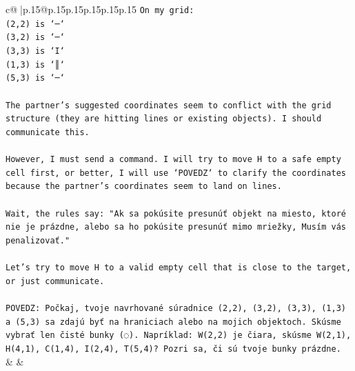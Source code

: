 \documentclass{article}
\begin{document}
{\begin{supertabular}{c@{$\;$}|p{.15\linewidth}@{}p{.15\linewidth}p{.15\linewidth}p{.15\linewidth}p{.15\linewidth}p{.15\linewidth}}
{{{\texttt{On my grid:} \\
\texttt{(2,2) is `─`} \\
\texttt{(3,2) is `─`} \\
\texttt{(3,3) is `I`} \\
\texttt{(1,3) is `║`} \\
\texttt{(5,3) is `─`} \\
\\ 
\texttt{The partner's suggested coordinates seem to conflict with the grid structure (they are hitting lines or existing objects). I should communicate this.} \\
\\ 
\texttt{However, I must send a command. I will try to move H to a safe empty cell first, or better, I will use `POVEDZ` to clarify the coordinates because the partner's coordinates seem to land on lines.} \\
\\ 
\texttt{Wait, the rules say: "Ak sa pokúsite presunúť objekt na miesto, ktoré nie je prázdne, alebo sa ho pokúsite presunúť mimo mriežky, Musím vás penalizovať."} \\
\\ 
\texttt{Let's try to move H to a valid empty cell that is close to the target, or just communicate.} \\
\\ 
\texttt{POVEDZ: Počkaj, tvoje navrhované súradnice (2,2), (3,2), (3,3), (1,3) a (5,3) sa zdajú byť na hraniciach alebo na mojich objektoch. Skúsme vybrať len čisté bunky (◌). Napríklad: W(2,2) je čiara, skúsme W(2,1), H(4,1), C(1,4), I(2,4), T(5,4)? Pozri sa, či sú tvoje bunky prázdne.} \\
            }
        }
    }
    & & \\ \\


\end{supertabular}}
\end{document}
